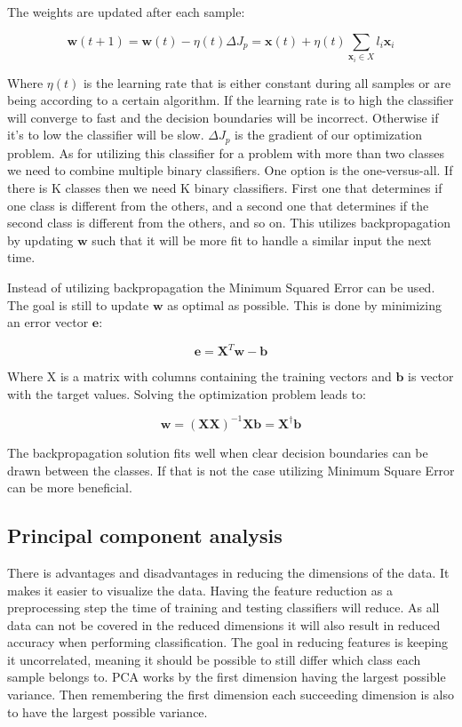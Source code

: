 The weights are updated after each sample: 

\begin{equation}
    \mathbf{w}(t+1) = \mathbf{w}(t) - \eta(t) {\Delta} J_p = \mathbf{x}(t) + \eta(t) \sum_{\mathbf{x}_i \in X}{l_i \mathbf{x}_i}
\end{equation}

Where $\eta(t)$ is the learning rate that is either constant during all samples or are being according to a certain algorithm. If the learning rate is to high the classifier will converge to fast and the decision boundaries will be incorrect. Otherwise if it's to low the classifier will be slow. $\Delta J_p$ is the gradient of our optimization problem. As for utilizing this classifier for a problem with more than two classes we need to combine multiple binary classifiers. One option is the one-versus-all. If there is K classes then we need K binary classifiers. First one that determines if one class is different from the others, and a second one that determines if the second class is different from the others, and so on. This utilizes backpropagation by updating $\mathbf{w}$ such that it will be more fit to handle a similar input the next time\cite{ai-course-notes}.     

Instead of utilizing backpropagation the Minimum Squared Error can be used. The goal is still to update $\mathbf{w}$ as optimal as possible. This is done by minimizing an error vector $\mathbf{e}$:

\begin{equation}
    \mathbf{e} = \mathbf{X}^T \mathbf{w} - \mathbf{b}
\end{equation}

Where X is a matrix with columns containing the training vectors and $\mathbf{b}$ is vector with the target values. Solving the optimization problem leads to\cite{ai-course-notes}: 


\begin{equation}
    \mathbf{w} = (\mathbf{X} \mathbf{X})^{-1} \mathbf{X} \mathbf{b} = \mathbf{X}^\dagger \mathbf{b}
\end{equation}

The backpropagation solution fits well when clear decision boundaries can be drawn between the classes. If that is not the case utilizing Minimum Square Error can be more beneficial. 

\subsection{Principal component analysis}
There is advantages and disadvantages in reducing the dimensions of the data. It makes it easier to visualize the data. Having the feature reduction as a preprocessing step the time of training and testing classifiers will reduce. As all data can not be covered in the reduced dimensions it will also result in reduced accuracy when performing classification. The goal in reducing features is keeping it uncorrelated, meaning it should be possible to still differ which class each sample belongs to. PCA works by the first dimension having the largest possible variance. Then remembering the first dimension each succeeding dimension is also to have the largest possible variance\cite{ai-course-notes}.  
